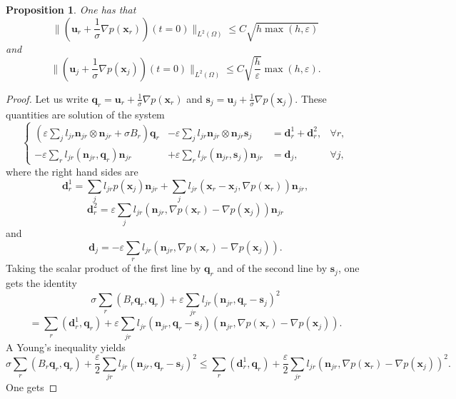 \documentclass[a4paper,french,english,10pt]{article}
\newcommand\ljr{l_{jr}}
\newcommand\njr{\mathbf{n}_{jr}}
\newcommand\uu{\mathbf{u}}
\newcommand\eps{\varepsilon}
\newcommand\x{\mathbf{x}}
\newtheorem{pro}[theorem]{Proposition}
\begin{document}
\begin{pro}\label{esti_initial_data}
One has that
\begin{equation*} \label{eq:iner1}
\bigg\| \left(  \uu_r +\frac1\sigma \nabla p(\x _r)\right)(t=0)\bigg\|_
{ L^2(\Omega) }\leq C \sqrt {h\max( h, \eps )}
\end{equation*}
and
\begin{equation} \label{eq:iner10}
\bigg\| \left(  \uu_j +\frac1\sigma \nabla p(\x _j)\right)(t=0)\bigg\|_
{ L^2(\Omega) }\leq C  
 \sqrt{ \frac{h}\eps} \max(  h, \eps).  
\end{equation}
\end{pro}
\begin{proof}
Let us write $\mathbf q_r= \uu_r +\frac1\sigma \nabla p(\x _r)$
and $\mathbf s_j= \uu_j +\frac1\sigma \nabla p(\x _j)$.
These quantities are solution
of the system
$$
\left\{
\begin{array}{ccll}
 \left( \eps\sum_{j}l_{jr} \njr\otimes \njr  +  \sigma B_r\right) \mathbf q_r
& -
\eps \sum_{j}l_{jr} \njr\otimes \njr \mathbf s_j& =
\mathbf  d_r^1+\mathbf  d_r^2 , & \forall r,  \\
- \eps \sum_{r}l_{jr} (\njr, \mathbf q_r )\njr & +  
\eps  \sum_{r}l_{jr} (\njr, \mathbf s_j )\njr& =\mathbf  d_j,
&
 \forall j, 
\end{array}
\right.
$$
where the right hand sides are
$$
\mathbf  d_r^1=
\sum_{j}\ljr   p(\mathbf x_j)\njr+ \sum_j l_{jr}  (\x_r -\x_j, \nabla p(\x_r))\njr,
$$
$$
\mathbf  d_r^2=\eps\sum_j l_{jr}  \left( \njr, \nabla p(\x_r)
- \nabla p(\x_j) \right)
\njr    
$$
and
$$
\mathbf  d_j=-\eps\sum_r l_{jr}  \left( \njr, \nabla p(\x_r)
- \nabla p(\x_j) \right).
$$
Taking the scalar product of the first line by $\mathbf q_r$
and of the second line by   $\mathbf s_j$, one gets the identity
$$
\sigma \sum_r \left(B_r \mathbf q_r, \mathbf q_r    \right)
+ \eps \sum_{jr} l_{jr}
\left( \njr, \mathbf q_r - \mathbf s_j  \right)^2
$$
$$
=
\sum_r \left( \mathbf d_r^1, \mathbf q_r   \right)+  
\eps \sum_{jr} l_{jr}
\left( \njr, \mathbf q_r - \mathbf s_j  \right)
\left( \njr, 
 \nabla p(\x_r)
- \nabla p(\x_j)
 \right).
$$
A Young's inequality yields
\begin{equation} \label{eq:y1}
\sigma \sum_r \left(B_r \mathbf q_r, \mathbf q_r    \right)
+\frac\eps2
 \sum_{jr} l_{jr}
\left( \njr, \mathbf q_r - \mathbf s_j  \right)^2\leq 
\sum_r \left( \mathbf d_r^1, \mathbf q_r   \right)+
 \frac\eps2  \sum_{jr} l_{jr}
\left( \njr, 
 \nabla p(\x_r)
- \nabla p(\x_j)
 \right)^2.
\end{equation}
One gets

\end{proof}
\end{document}
